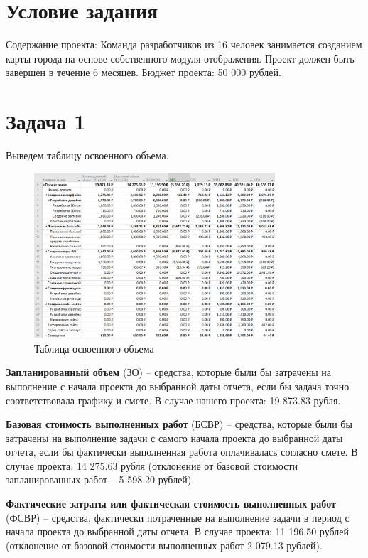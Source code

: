 \section{Условие задания}

Содержание проекта: Команда разработчиков из 16 человек занимается созданием карты города на основе собственного модуля отображения. Проект должен быть завершен в течение 6 месяцев. Бюджет проекта: 50 000 рублей.

\section{Задача 1}

Выведем таблицу освоенного объема.

\begin{figure}[H]
    \centering
    \includegraphics[width=0.8\textwidth]{img/content/task_01.png}
    \caption{Таблица освоенного объема}
    \label{fig:task_01}
\end{figure}

\textbf{Запланированный объем} (ЗО) -- средства, которые были бы затрачены на выполнение с начала проекта до выбранной даты отчета, если бы задача точно соответствовала графику и смете. В случае нашего проекта: 19 873.83 рубля.

\textbf{Базовая стоимость выполненных работ} (БСВР) -- средства, которые были бы затрачены на выполнение задачи с самого начала проекта до выбранной даты отчета, если бы фактически выполненная работа оплачивалась согласно смете. В случае проекта: 14 275.63 рубля (отклонение от базовой стоимости запланированных работ -- 5 598.20 рублей).

\textbf{Фактические затраты или фактическая стоимость выполненных работ} (ФСВР) -- средства, фактически потраченные на выполнение задачи в период с начала проекта до выбранной даты отчета. В случае проекта: 11 196.50 рублей (отклонение от базовой стоимости выполненных работ 2 079.13 рублей). 

